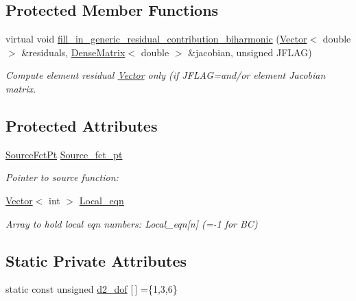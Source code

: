 \subsection*{Protected Member Functions}
\begin{DoxyCompactItemize}
\item 
virtual void \hyperlink{classoomph_1_1BiharmonicEquations_a63bf0dbf59b9355563e71cf0b9eff2ee}{fill\+\_\+in\+\_\+generic\+\_\+residual\+\_\+contribution\+\_\+biharmonic} (\hyperlink{classoomph_1_1Vector}{Vector}$<$ double $>$ \&residuals, \hyperlink{classoomph_1_1DenseMatrix}{Dense\+Matrix}$<$ double $>$ \&jacobian, unsigned J\+F\+L\+AG)
\begin{DoxyCompactList}\small\item\em Compute element residual \hyperlink{classoomph_1_1Vector}{Vector} only (if J\+F\+L\+AG=and/or element Jacobian matrix. \end{DoxyCompactList}\end{DoxyCompactItemize}
\subsection*{Protected Attributes}
\begin{DoxyCompactItemize}
\item 
\hyperlink{classoomph_1_1BiharmonicEquations_aafa48cd7bbc8ce4383224d1d2d0bfda3}{Source\+Fct\+Pt} \hyperlink{classoomph_1_1BiharmonicEquations_a2711ff2523edd383374fd7ff5692ae48}{Source\+\_\+fct\+\_\+pt}
\begin{DoxyCompactList}\small\item\em Pointer to source function\+: \end{DoxyCompactList}\item 
\hyperlink{classoomph_1_1Vector}{Vector}$<$ int $>$ \hyperlink{classoomph_1_1BiharmonicEquations_aee9ddb4f76f29a946c524d0280b13747}{Local\+\_\+eqn}
\begin{DoxyCompactList}\small\item\em Array to hold local eqn numbers\+: Local\+\_\+eqn\mbox{[}n\mbox{]} (=-\/1 for BC) \end{DoxyCompactList}\end{DoxyCompactItemize}
\subsection*{Static Private Attributes}
\begin{DoxyCompactItemize}
\item 
static const unsigned \hyperlink{classoomph_1_1BiharmonicEquations_a43f2c15a2438a7710738a3f6faca6e61}{d2\+\_\+dof} \mbox{[}$\,$\mbox{]} =\{1,3,6\}
\end{DoxyCompactItemize}
